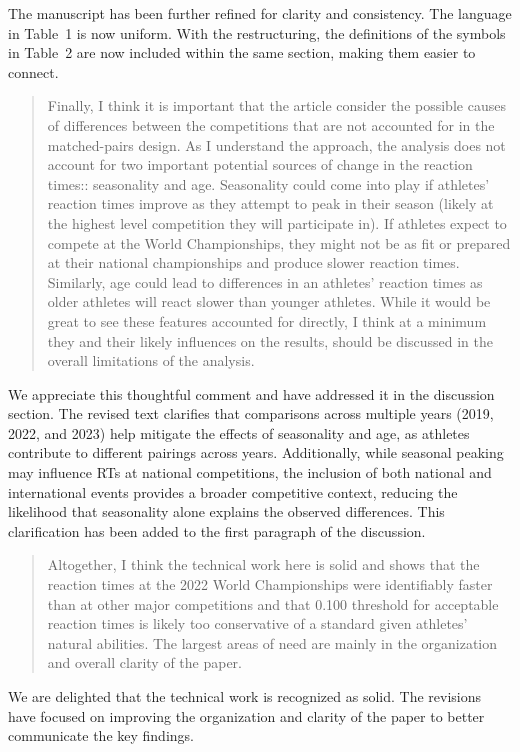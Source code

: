 \documentclass[12pt]{article}
\newenvironment{comment}%
{\begin{quotation}\noindent\small\it\color{darkblue}\ignorespaces%
}{\end{quotation}}
\begin{document}
The manuscript has been further refined for clarity and
consistency. The language in Table~1 is now uniform. With the
restructuring, the definitions of the symbols in Table~2 are now
included within the same section, making them easier to connect.

\begin{comment}
Finally, I think it is important that the article consider the possible causes
of differences between the competitions that are not accounted for in the
matched-pairs design. As I understand the approach, the analysis does not
account for two important potential sources of change in the reaction times::
seasonality and age. Seasonality could come into play if athletes' reaction
times improve as they attempt to peak in their season (likely at the highest
level competition they will participate in). If athletes expect to compete at
the World Championships, they might not be as fit or prepared at their national
championships and produce slower reaction times. Similarly, age could lead to
differences in an athletes' reaction times as older athletes will react slower
than younger athletes. While it would be great to see these features accounted
for directly, I think at a minimum they and their likely influences on the
results, should be discussed in the overall limitations of the analysis.
\end{comment}

We appreciate this thoughtful comment and have addressed it in the
discussion section. The revised text clarifies that comparisons across
multiple years (2019, 2022, and 2023) help mitigate the effects of
seasonality and age, as athletes contribute to different pairings
across years. Additionally, while seasonal peaking may influence RTs
at national competitions, the inclusion of both national and
international events provides a broader competitive context, reducing
the likelihood that seasonality alone explains the observed
differences. This clarification has been added to the first paragraph
of the discussion.

\begin{comment}
Altogether, I think the technical work here is solid and shows that the reaction
times at the 2022 World Championships were identifiably faster than at other
major competitions and that 0.100 threshold for acceptable reaction times is
likely too conservative of a standard given athletes' natural abilities. The
largest areas of need are mainly in the organization and overall clarity of the
paper.
\end{comment}

We are delighted that the technical work
is recognized as solid. The revisions have focused on improving the
organization and clarity of the paper to better communicate the key
findings.




\end{document}
